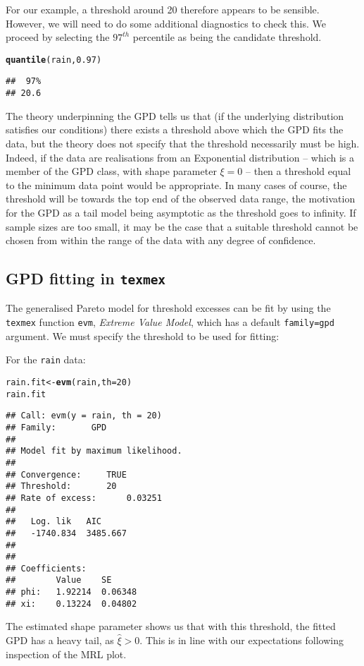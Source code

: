 \documentclass[10pt]{article}\usepackage[]{graphicx}\usepackage[]{color}
\makeatletter
\newcommand{\hlnum}[1]{\textcolor[rgb]{0.686,0.059,0.569}{#1}}%
\newcommand{\hlstd}[1]{\textcolor[rgb]{0.345,0.345,0.345}{#1}}%
\newcommand{\hlkwb}[1]{\textcolor[rgb]{0.69,0.353,0.396}{#1}}%
\newcommand{\hlkwc}[1]{\textcolor[rgb]{0.333,0.667,0.333}{#1}}%
\newcommand{\hlkwd}[1]{\textcolor[rgb]{0.737,0.353,0.396}{\textbf{#1}}}%
\newenvironment{kframe}{%
 \def\at@end@of@kframe{}%
 \ifinner\ifhmode%
  \def\at@end@of@kframe{\end{minipage}}%
  \begin{minipage}{\columnwidth}%
 \fi\fi%
 \def\FrameCommand##1{\hskip\@totalleftmargin \hskip-\fboxsep
 \colorbox{shadecolor}{##1}\hskip-\fboxsep
     \hskip-\linewidth \hskip-\@totalleftmargin \hskip\columnwidth}%
 \MakeFramed {\advance\hsize-\width
   \@totalleftmargin\z@ \linewidth\hsize
   \@setminipage}}%
 {\par\unskip\endMakeFramed%
 \at@end@of@kframe}
\newenvironment{knitrout}{}{} %
\makeatother
\begin{document}
For our example, a threshold around 20 therefore appears to be sensible. However, we will need to
do some additional diagnostics to check this.
We proceed by selecting the $97^{th}$ percentile
as being the candidate threshold.
\begin{knitrout}
\color{fgcolor}\begin{kframe}
\begin{alltt}
\hlkwd{quantile}\hlstd{(rain,}\hlnum{0.97}\hlstd{)}
\end{alltt}
\begin{verbatim}
##  97% 
## 20.6
\end{verbatim}
\end{kframe}
\end{knitrout}
The theory underpinning the GPD tells us that (if the underlying distribution satisfies our conditions) there exists a
threshold above which the GPD fits the data, but the
theory does not specify that the threshold necessarily must be
high.  Indeed, if the data are realisations from an Exponential distribution -- which is a member of the GPD class, with shape parameter $\xi=0$ --  then a threshold equal to the minimum data point would be appropriate.  In many cases of course, the threshold will be towards the top end of the observed data range, the motivation for the GPD as a tail model being asymptotic as the threshold goes to infinity.  If sample sizes are too small, it may be the case that a suitable threshold cannot be chosen from within the range of the data with any degree of confidence.
%
\subsection{GPD fitting in {\tt texmex}}
%

The generalised Pareto model for threshold excesses can
be fit by using the {\tt texmex} function {\tt evm}, {\it Extreme Value Model}, which has a default {\tt family=gpd} argument.  We must specify the threshold to be used for fitting:

For the {\tt rain} data:
\begin{knitrout}
\color{fgcolor}\begin{kframe}
\begin{alltt}
\hlstd{rain.fit} \hlkwb{<-} \hlkwd{evm}\hlstd{(rain,}\hlkwc{th}\hlstd{=}\hlnum{20}\hlstd{)}
\hlstd{rain.fit}
\end{alltt}
\begin{verbatim}
## Call: evm(y = rain, th = 20)
## Family:       GPD 
## 
## Model fit by maximum likelihood.
## 
## Convergence:		TRUE
## Threshold:		20
## Rate of excess:		0.03251
## 
##   Log. lik   AIC     
##   -1740.834  3485.667
## 
## 
## Coefficients:
##        Value    SE     
## phi:   1.92214  0.06348
## xi:    0.13224  0.04802
\end{verbatim}
\end{kframe}
\end{knitrout}
The estimated shape parameter shows us that with this threshold, the fitted GPD has a heavy tail, as $\hat\xi>0$.  This is in line with our expectations following inspection of the MRL plot.
\end{document}
